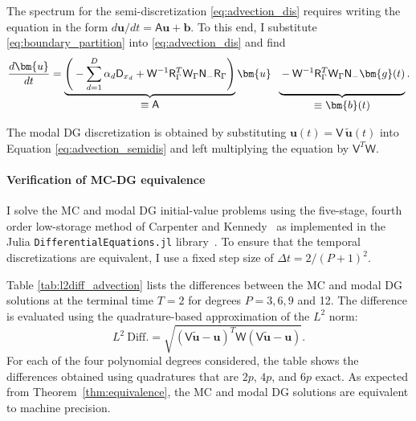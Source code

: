 \documentclass[pdflatex,sn-mathphys-num]{sn-jnl}%
\theoremstyle{thmstyleone}%
\theoremstyle{thmstyletwo}%
\theoremstyle{thmstylethree}%
\newcommand{\mat}[1]{\ensuremath{\mathsf{#1}}}
\begin{document}
The spectrum for the semi-discretization \eqref{eq:advection_dis} requires writing the equation in the form $d\bm{u}/dt = \mat{A} \bm{u} + \bm{b}$. To this end, I substitute \eqref{eq:boundary_partition} into \eqref{eq:advection_dis} and find
\begin{equation}\label{eq:advection_semidis}
\frac{d \bm{u}}{dt} = \underbrace{\Bigg( -\sum_{d=1}^{D} \alpha_d \mat{D}_{x_d} + 
\mat{W}^{-1} \mat{R}_{\Gamma}^T \mat{W}_\Gamma \mat{N}_{-} \mat{R}_{\Gamma} \Bigg)}_{\displaystyle \equiv \mat{A}}\bm{u} \;\; \underbrace{\rule[-3ex]{0ex}{3ex} - \mat{W}^{-1} \mat{R}_{\Gamma}^T \mat{W}_{\Gamma} \mat{N}_{-} \bm{g}(t)}_{\displaystyle \equiv \bm{b}(t)}.
\end{equation}

The modal DG discretization is obtained by substituting $\bm{u}(t) = \mat{V}\, \tilde{\bm{u}}(t)$ into Equation \eqref{eq:advection_semidis} and left multiplying the equation by $\mat{V}^T \mat{W}$.

\paragraph{Verification of MC-DG equivalence}

I solve the MC and modal DG initial-value problems using the five-stage, fourth order low-storage method of Carpenter and Kennedy~\cite{Carpenter1994fourth} as implemented in the Julia \texttt{DifferentialEquations.jl} library~\cite{Rackauckas2017differentialequations}.  To ensure that the temporal discretizations are equivalent, I use a fixed step size of $\Delta t = 2/(P+1)^2$.  

Table \ref{tab:l2diff_advection} lists the differences between the MC and modal DG solutions at the terminal time $T=2$ for degrees $P=3, 6, 9$ and 12.  The difference is evaluated using the quadrature-based approximation of the $L^2$ norm:
\begin{equation}\label{eq:l2_diff}
    L^2~\text{Diff.} = \sqrt{(\mat{V}\tilde{\bm{u}} - \bm{u})^T \mat{W} (\mat{V}\tilde{\bm{u}} - \bm{u})}.
\end{equation}
For each of the four polynomial degrees considered, the table shows the differences obtained using quadratures that are $2p$, $4p$, and $6p$ exact.  As expected from Theorem~\ref{thm:equivalence}, the MC and modal DG solutions are equivalent to machine precision.
\end{document}
